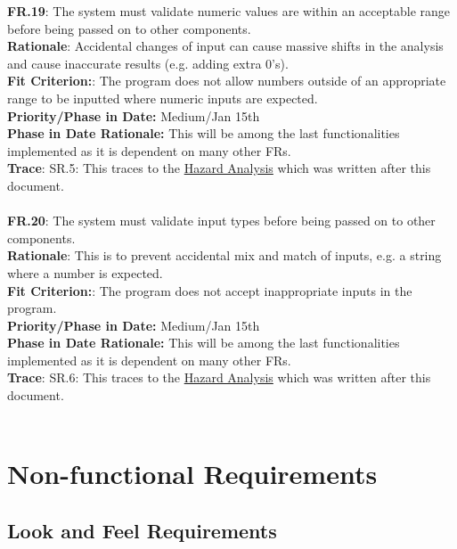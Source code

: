 \documentclass[12pt]{article}
\begin{document}
  \noindent\textbf{FR.19}: The system must validate numeric values are within an acceptable range before being passed on to other components.\\
  \textbf{Rationale}: Accidental changes of input can cause massive shifts in the analysis and cause inaccurate results 
  (e.g. adding extra 0's).\\
  \textbf{Fit Criterion:}: The program does not allow numbers outside of an appropriate range to be inputted where numeric inputs are expected.\\
  \textbf{Priority/Phase in Date:} Medium/Jan 15th\\
  \textbf{Phase in Date Rationale:} This will be among the last functionalities implemented as it is dependent on many other FRs.\\
  \textbf{Trace}: SR.5: This traces to the \href{https://github.com/agentvv/MTOBridge/blob/main/docs%20Rev1/HazardAnalysis/HazardAnalysis.pdf}{Hazard Analysis} which was written after this document.\\\\

  \noindent\textbf{FR.20}: The system must validate input types before being passed on to other components.\\
  \textbf{Rationale}: This is to prevent accidental mix and match of inputs, e.g. a string where a number is expected.\\
  \textbf{Fit Criterion:}: The program does not accept inappropriate inputs in the program.\\
  \textbf{Priority/Phase in Date:} Medium/Jan 15th\\
  \textbf{Phase in Date Rationale:} This will be among the last functionalities implemented as it is dependent on many other FRs.\\
  \textbf{Trace}: SR.6: This traces to the \href{https://github.com/agentvv/MTOBridge/blob/main/docs%20Rev1/HazardAnalysis/HazardAnalysis.pdf}{Hazard Analysis} which was written after this document.\\\\

\section{Non-functional Requirements}

\subsection{Look and Feel Requirements}
\end{document}
